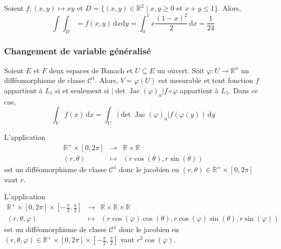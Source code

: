 	
	\begin{example}
		Soient $f : (x,y) \mapsto xy$ et $D = \{ (x,y) \in \mathbb{R}^2 \mid x, y \geq 0 \text{ et } x + y \leq 1 \}$. Alors,
		\[ \int \int_D = f(x,y) \, \mathrm{d}x \mathrm{d}y = \int_0^1 x \frac{(1-x)^2}{2} \, \mathrm{d}x = \frac{1}{24} \]
	\end{example}
	
	\subsubsection{Changement de variable généralisé}
	
	
	\begin{theorem}
		Soient $E$ et $F$ deux espaces de Banach et $U \subseteq E$ un ouvert.
		Soit $\varphi : U \rightarrow \mathbb{R}^n$ un difféomorphisme de classe $\mathcal{C}^1$. Alors, $V = \varphi(U)$ est mesurable et tout fonction $f$ appartient à $L_1$ si et seulement si $\vert \det \operatorname{Jac}(\varphi)_a \vert f \circ \varphi$ appartient à $L_1$. Dans ce cas,
		\[ \int_V f(x) \, \mathrm{d}x = \int_U \vert \det \operatorname{Jac}(\varphi)_a \vert f (\varphi(y)) \, \mathrm{d}y \]
	\end{theorem}
	
	
	\begin{example}
		L'application
		\[
			\begin{array}{ccc}
				\mathbb{R}^+ \times [0,2\pi] &\rightarrow& \mathbb{R} \times \mathbb{R} \\
				(r,\theta) &\mapsto& (r\cos(\theta), r\sin(\theta))
			\end{array}
		\]
		est un difféomorphisme de classe $\mathcal{C}^1$ donc le jacobien en $(r,\theta) \in \mathbb{R}^+ \times [0,2\pi]$ vaut $r$.
	\end{example}
	
	\begin{example}
		L'application
		\[
			\begin{array}{ccc}
				\mathbb{R}^+ \times [0,2\pi] \times \left[ -\frac{\pi}{2}, \frac{\pi}{2} \right] &\rightarrow& \mathbb{R} \times \mathbb{R} \times \mathbb{R} \\
				(r,\theta,\varphi) &\mapsto& (r\cos(\varphi)\cos(\theta), r\cos(\varphi)\sin(\theta), r\sin(\varphi))
			\end{array}
		\]
		est un difféomorphisme de classe $\mathcal{C}^1$ donc le jacobien en $(r,\theta,\varphi) \in \mathbb{R}^+ \times [0,2\pi] \times \left[ -\frac{\pi}{2}, \frac{\pi}{2} \right]$ vaut $r^2 \cos(\varphi)$.
	\end{example}
	
